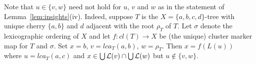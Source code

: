 Note that $u\in \{v,w\}$ need not hold for $u$, $v$
and $w$ as in the statement of Lemma~\ref{lem:insights}(iv). 
Indeed, suppose $T$ is the $X=\{a,b,c,d\}$-tree
with unique cherry $\{a,b\}$ and $d$ adjacent with the
root $\rho_T$ of $T$. Let $\sigma$ denote the lexicographic ordering 
of $X$ and let $f:cl(T)\to X$ be (the unique) 
cluster marker map for $T$ and $\sigma$.
Set $x=b$, $v=lca_T(a,b)$, $w=\rho_T$.
Then $x=f(L(u))$ where $u=lca_T(a,c)$ and
$x\in \bigcup{\mathcal L}(v)\cap \bigcup{\mathcal L}(w)$ but $u\not\in \{v,w\}$.



%

